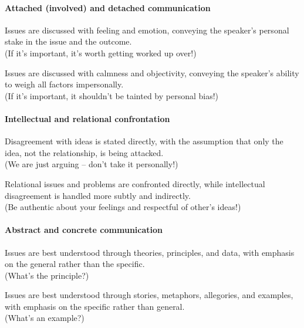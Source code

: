 \paragraph{Attached (involved) and detached communication}
\begin{description}
	\tightlist
	\item[Attached] Issues are discussed with feeling and emotion, conveying the speaker’s personal stake in the issue and the outcome.\\
	(If it’s important, it’s worth getting worked up over!)
	\item[Detatched] Issues are discussed with calmness and objectivity, conveying the speaker’s ability to weigh all factors impersonally.\\ (If it’s important, it shouldn’t be tainted by personal bias!)
\end{description}

\paragraph{Intellectual and relational confrontation}
\begin{description}
	\tightlist
	\item[Intellectual confrontaion] Disagreement with ideas is stated directly, with the assumption that only the idea, not the relationship, is being attacked.\\
	(We are just arguing – don’t take it personally!)
	\item[Relational confrontation] Relational issues and problems are confronted directly, while intellectual disagreement is handled more subtly and indirectly.\\
	(Be authentic about your feelings and respectful of other’s ideas!)
\end{description}

\paragraph{Abstract and concrete communication}
\begin{description}
	\tightlist
	\item[Abstract] Issues are best understood through theories, principles, and data, with emphasis on the general rather than the specific.\\
	(What’s the principle?)
	\item[Concrete] Issues are best understood through stories, metaphors, allegories, and examples, with emphasis on the specific rather than general.\\
	(What’s an example?)
\end{description}

